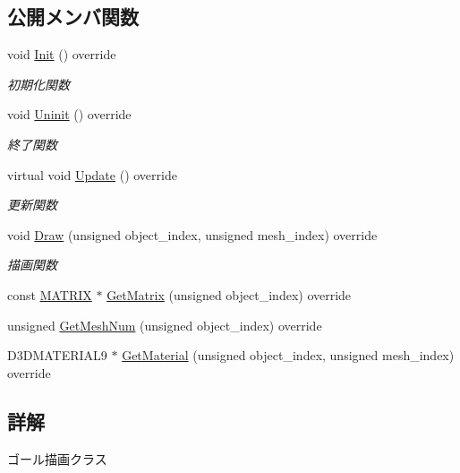 \subsection*{公開メンバ関数}
\begin{DoxyCompactItemize}
\item 
void \mbox{\hyperlink{class_goal_draw_a3eb0a555fa2db9d2c1253018ea65796e}{Init}} () override
\begin{DoxyCompactList}\small\item\em 初期化関数 \end{DoxyCompactList}\item 
void \mbox{\hyperlink{class_goal_draw_a01318a0606848a3ca8ca7b7acbf4df24}{Uninit}} () override
\begin{DoxyCompactList}\small\item\em 終了関数 \end{DoxyCompactList}\item 
virtual void \mbox{\hyperlink{class_goal_draw_a6e003277ed44eb9c800a616b6acbcb20}{Update}} () override
\begin{DoxyCompactList}\small\item\em 更新関数 \end{DoxyCompactList}\item 
void \mbox{\hyperlink{class_goal_draw_a554c826d7a4534ee489dfe18edf7ee0e}{Draw}} (unsigned object\+\_\+index, unsigned mesh\+\_\+index) override
\begin{DoxyCompactList}\small\item\em 描画関数 \end{DoxyCompactList}\item 
const \mbox{\hyperlink{_vector3_d_8h_a032295cd9fb1b711757c90667278e744}{M\+A\+T\+R\+IX}} $\ast$ \mbox{\hyperlink{class_goal_draw_a50fa9ceaaecdff9910e0f91e65ad9e95}{Get\+Matrix}} (unsigned object\+\_\+index) override
\item 
unsigned \mbox{\hyperlink{class_goal_draw_a7f30c7a4325668eebd8730ad2bea1ad8}{Get\+Mesh\+Num}} (unsigned object\+\_\+index) override
\item 
D3\+D\+M\+A\+T\+E\+R\+I\+A\+L9 $\ast$ \mbox{\hyperlink{class_goal_draw_a47baf72f8c1c961176610f161069b8d1}{Get\+Material}} (unsigned object\+\_\+index, unsigned mesh\+\_\+index) override
\end{DoxyCompactItemize}


\subsection{詳解}
ゴール描画クラス 

